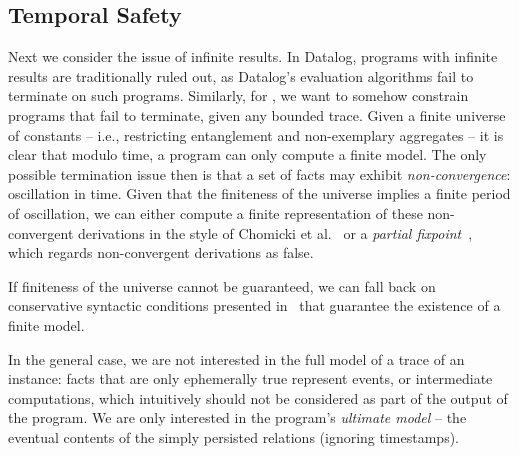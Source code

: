 
%
%
%

\subsection{Temporal Safety}

Next we consider the issue of infinite results.  In Datalog, programs with
infinite results are traditionally ruled out, as Datalog's evaluation
algorithms fail to terminate on such programs.  Similarly, for \lang, we want
to somehow constrain programs that fail to terminate, given any bounded trace.
Given a finite universe of constants -- i.e., restricting entanglement and
non-exemplary aggregates -- it is clear that modulo time, a \lang program can
only compute a finite model.  The only possible termination issue then is that
a set of facts may exhibit {\em non-convergence}: oscillation in time.  Given
that the finiteness of the universe implies a finite period of oscillation, we
can either compute a finite representation of these non-convergent derivations
in the style of Chomicki et al.~\cite{chomicki-infinite} or a {\em partial
fixpoint}~\cite{abiteboul-vianu}, which regards non-convergent derivations as
false.

If finiteness of the universe cannot be guaranteed, we can fall back on
conservative syntactic conditions presented in~\cite{dedalus-techr} that
guarantee the existence of a finite model.

In the general case, we are not interested in the full model of a trace of an
instance: facts that are only ephemerally true represent events, or
intermediate computations, which intuitively should not be considered as part
of the output of the program.  We are only interested in the program's {\em
ultimate model} -- the eventual contents of the simply persisted relations
(ignoring timestamps).

